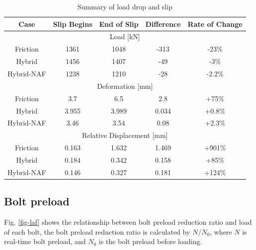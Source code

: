 \begin{table}[]
\centering
\caption{ Summary of load drop and slip }
\label{tab-sumld}
\begin{tabular}{@{}ccccc@{}}
\toprule
Case & Slip Begins & End of Slip & Difference & Rate of Change \\ \midrule
\multicolumn{5}{c}{Load {[}kN{]}} \\
Friction & 1361 & 1048 & -313 & -23\% \\
Hybrid & 1456 & 1407 & -49 & -3\% \\
Hybrid-NAF & 1238 & 1210 & -28 & -2.2\% \\
\multicolumn{5}{c}{Deformation {[}mm{]}} \\
Friction & 3.7 & 6.5 & 2.8 & +75\% \\
Hybrid & 3.955 & 3.989 & 0.034 & +0.8\% \\
Hybrid-NAF & 3.46 & 3.54 & 0.08 & +2.3\% \\
\multicolumn{5}{c}{Relative Displacement {[}mm{]}} \\
Friction & 0.163 & 1.632 & 1.469 & +901\% \\
Hybrid & 0.184 & 0.342 & 0.158 & +85\% \\ 
Hybrid-NAF & 0.146 & 0.327 & 0.181 & +124\% \\ 
\bottomrule
\end{tabular}
\end{table}




\subsection{Bolt preload}

Fig. \ref{fig-laf} shows the relationship between bolt preload reduction ratio and load of each bolt, the bolt preload reduction ratio is calculated by $N/N_0$, where $N$ is real-time bolt preload, and $N_0$ is the bolt preload before loading. 

